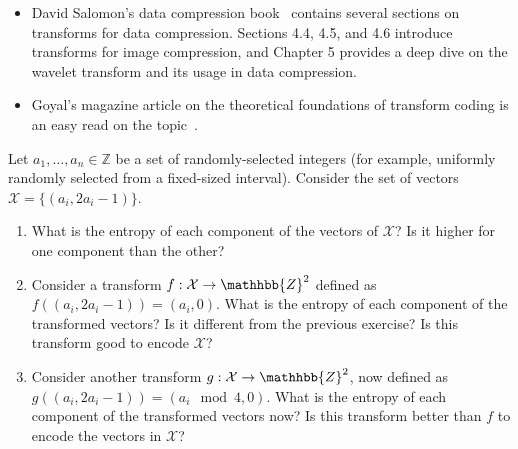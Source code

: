 \begin{itemize}
\item David Salomon's data compression book~\cite{salomon_compression_complete} contains several sections on transforms for data compression. Sections 4.4, 4.5, and 4.6 introduce transforms for image compression, and Chapter 5 provides a deep dive on the wavelet transform and its usage in data compression.
\vspace{0.1cm}
\item Goyal's magazine article on the theoretical foundations of transform coding is an easy read on the topic~\cite{goyal_transform_coding}.
\end{itemize}

\begin{exercise}
Let $a_1, \ldots, a_n\in\mathbb{Z}$ be a set of randomly-selected integers (for example, uniformly randomly selected from a fixed-sized interval). Consider the set of vectors $\mathcal{X}=\lbrace (a_i, 2a_i -1) \rbrace$.
\begin{enumerate}
\item What is the entropy of each component of the vectors of $\mathcal{X}$? Is it higher for one component than the other?
\item Consider a transform $f : \mathcal{X} \rightarrow \mathhbb{Z}^2$ defined as $f((a_i, 2a_i -1)) = (a_i, 0)$. What is the entropy of each component of the transformed vectors? Is it different from the previous exercise? Is this transform good to encode $\mathcal{X}$?
\item Consider another transform $g : \mathcal{X} \rightarrow \mathhbb{Z}^2$, now defined as $g((a_i, 2a_i -1)) = (a_i \mod 4, 0)$. What is the entropy of each component of the transformed vectors now? Is this transform better than $f$ to encode the vectors in $\mathcal{X}$?
\end{enumerate}
\end{exercise}

